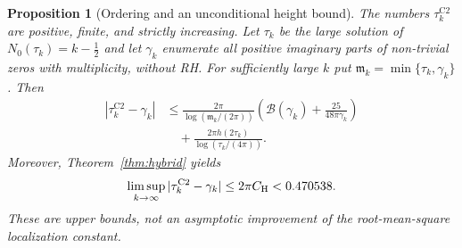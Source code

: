 \documentclass[11pt,reqno]{amsart}
\numberwithin{equation}{section}
\newtheorem{proposition}[theorem]{Proposition}
\theoremstyle{definition}
\theoremstyle{remark}
\begin{document}
\begin{proposition}[Ordering and an unconditional height bound]
\label{prop:tauC2_v8}
The numbers $\tau_k^{\mathrm{C2}}$ are positive, finite, and
strictly increasing. Let $\tau_k$ be the large solution of
$N_0(\tau_k)=k-\frac12$ and let $\gamma_k$ enumerate all positive
imaginary parts of non-trivial zeros with multiplicity, without RH.
For sufficiently large $k$ put
$\mathfrak m_k=\min\{\tau_k,\gamma_k\}$. Then
\begin{equation}
\begin{aligned}
 |\tau_k^{\mathrm{C2}}-\gamma_k|
 &\le\frac{2\pi}{\log(\mathfrak m_k/(2\pi))}
   \left(\mathcal B(\gamma_k)
             +\frac{25}{48\pi\gamma_k}\right)\\
 &\quad+\frac{2\pi h(2\tau_k)}{\log(\tau_k/(4\pi))}.
\end{aligned}
\label{eq:tauC2_explicit_v8}
\end{equation}
Moreover, Theorem~\ref{thm:hybrid} yields
\begin{equation}
 \limsup_{k\to\infty}|\tau_k^{\mathrm{C2}}-\gamma_k|
 \le 2\pi C_{\rm H}<0.470538.
 \label{eq:tauC2_limsup_v8}
\end{equation}
These are upper bounds, not an asymptotic improvement of the
root-mean-square localization constant.
\end{proposition}
\end{document}
